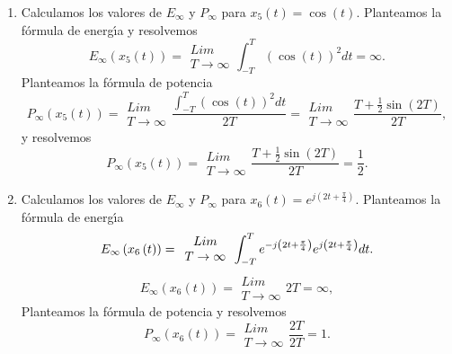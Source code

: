\begin{enumerate}
\item Calculamos los valores de $E_{\infty }$ y $P_{\infty }$ para 
$x_{5}\left( t\right) =\cos \left( t\right)$.
Planteamos la f\'{o}rmula de energ\'{\i}a y resolvemos
\begin{equation}
E_{\infty }\left( x_{5}\left( t\right) \right) = 
\begin{array}{c}
Lim \\ 
T\rightarrow \infty
\end{array}
\int_{-T}^{T}\left( \cos \left( t\right) \right) ^{2}dt = \infty.
\end{equation}
Planteamos la f\'{o}rmula de potencia
\begin{equation}
P_{\infty }\left( x_{5}\left( t\right) \right) = 
\begin{array}{c}
Lim \\ 
T\rightarrow \infty
\end{array}
\frac{\int_{-T}^{T}\left( \cos \left( t\right) \right) ^{2}dt}{2T}= 
\begin{array}{c}
Lim \\ 
T\rightarrow \infty
\end{array}
\frac{T+\frac{1}{2}\sin \left( 2T\right) }{2T},
\end{equation}
y resolvemos
\begin{equation}
P_{\infty }\left( x_{5}\left( t\right) \right) = 
\begin{array}{c}
Lim \\ 
T\rightarrow \infty
\end{array}
\frac{T+\frac{1}{2}\sin \left( 2T\right) }{2T}=\frac{1}{2}.
\end{equation}

\item Calculamos los valores de $E_{\infty }$ y $P_{\infty }$ para 
$x_{6}\left( t\right) =e^{j\left( 2t+\frac{\pi }{4}\right) }$.
Planteamos la f\'{o}rmula de energ\'{\i}a
\begin{equation}
E_{\infty }\left( x_{6}\left( t\right) \right) = 
\begin{array}{c}
Lim \\ 
T\rightarrow \infty
\end{array}
\int_{-T}^{T}e^{-j\left( 2t+\frac{\pi }{4}\right) }e^{j\left( 2t+\frac{\pi }{%
4}\right) }dt.
\end{equation}
\begin{equation}
E_{\infty }\left(x_{6}\left( t\right) \right) = 
\begin{array}{c}
Lim \\ 
T\rightarrow \infty
\end{array}
2T=\infty ,
\end{equation}
Planteamos la f\'{o}rmula de potencia y resolvemos
\begin{equation}
P_{\infty }\left( x_{6}\left( t\right) \right) = 
\begin{array}{c}
Lim \\ 
T\rightarrow \infty
\end{array}
\frac{2T}{2T}=1.
\end{equation}
\end{enumerate}

